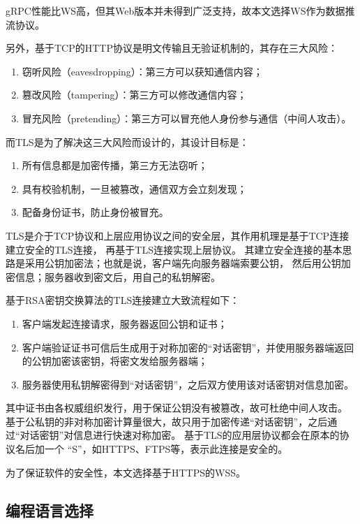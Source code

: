 gRPC性能比WS高，但其Web版本并未得到广泛支持，故本文选择WS作为数据推流协议。

另外，基于TCP的HTTP协议是明文传输且无验证机制的，其存在三大风险：
\begin{enumerate}
    \item 窃听风险（eavesdropping）：第三方可以获知通信内容；
    \item 篡改风险（tampering）：第三方可以修改通信内容；
    \item 冒充风险（pretending）：第三方可以冒充他人身份参与通信（中间人攻击）。
\end{enumerate}

而TLS是为了解决这三大风险而设计的，其设计目标是：

\begin{enumerate}
    \item 所有信息都是加密传播，第三方无法窃听；
    \item 具有校验机制，一旦被篡改，通信双方会立刻发现；
    \item 配备身份证书，防止身份被冒充。
\end{enumerate}

TLS是介于TCP协议和上层应用协议之间的安全层，其作用机理是基于TCP连接建立安全的TLS连接，
再基于TLS连接实现上层协议。
其建立安全连接的基本思路是采用公钥加密法；也就是说，客户端先向服务器端索要公钥，
然后用公钥加密信息；服务器收到密文后，用自己的私钥解密。

基于RSA密钥交换算法\cite{rfc8017}的TLS连接建立大致流程如下：

\begin{enumerate}
    \item 客户端发起连接请求，服务器返回公钥和证书；
    \item 客户端验证证书可信后生成用于对称加密的“对话密钥”，并使用服务器端返回的公钥加密该密钥，将密文发给服务器端；
    \item 服务器使用私钥解密得到“对话密钥”，之后双方使用该对话密钥对信息加密。
\end{enumerate}

其中证书由各权威组织发行，用于保证公钥没有被篡改，故可杜绝中间人攻击。
基于公私钥的非对称加密计算量很大，故只用于加密传递“对话密钥”，之后通过“对话密钥”对信息进行快速对称加密。
基于TLS的应用层协议都会在原本的协议名后加一个 “S”，如HTTPS、FTPS等，表示此连接是安全的。

为了保证软件的安全性，本文选择基于HTTPS的WSS。

\subsection{编程语言选择}
\label{sec:programming-language}


